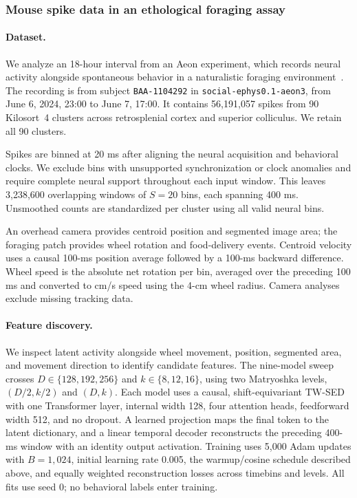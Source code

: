 \subsubsection{Mouse spike data in an ethological foraging assay}
\label{subsubsection:aeon_results_additional}

\paragraph{Dataset.}
We analyze an 18-hour interval from an Aeon experiment, which records neural activity alongside spontaneous behavior in a naturalistic foraging environment~\citep{campagner_2025_aeon_platform}. The recording is from subject \texttt{BAA-1104292} in \texttt{social-ephys0.1-aeon3}, from June 6, 2024, 23:00 to June 7, 17:00. It contains 56,191,057 spikes from 90 Kilosort~4 clusters across retrosplenial cortex and superior colliculus. We retain all 90 clusters.

Spikes are binned at 20 ms after aligning the neural acquisition and behavioral clocks. We exclude bins with unsupported synchronization or clock anomalies and require complete neural support throughout each input window. This leaves 3,238,600 overlapping windows of $S=20$ bins, each spanning 400 ms. Unsmoothed counts are standardized per cluster using all valid neural bins.

An overhead camera provides centroid position and segmented image area; the foraging patch provides wheel rotation and food-delivery events. Centroid velocity uses a causal 100-ms position average followed by a 100-ms backward difference. Wheel speed is the absolute net rotation per bin, averaged over the preceding 100 ms and converted to cm/s speed using the 4-cm wheel radius. Camera analyses exclude missing tracking data.

\paragraph{Feature discovery.}
We inspect latent activity alongside wheel movement, position, segmented area, and movement direction to identify candidate features. The nine-model sweep crosses $D\in\{128,192,256\}$ and $k\in\{8,12,16\}$, using two Matryoshka levels, $(D/2,k/2)$ and $(D,k)$. Each model uses a causal, shift-equivariant TW-SED with one Transformer layer, internal width 128, four attention heads, feedforward width 512, and no dropout. A learned projection maps the final token to the latent dictionary, and a linear temporal decoder reconstructs the preceding 400-ms window with an identity output activation. Training uses 5,000 Adam updates with $B=1,024$, initial learning rate 0.005, the warmup/cosine schedule described above, and equally weighted reconstruction losses across timebins and levels. All fits use seed 0; no behavioral labels enter training.

